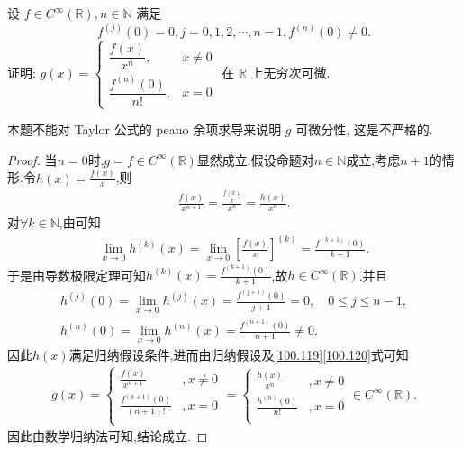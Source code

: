 \documentclass[../../main.tex]{subfiles}
\begin{document}
\begin{example}
设 $f \in C^\infty(\mathbb{R}), n \in \mathbb{N}$ 满足
\[
f^{(j)}(0) = 0, j = 0, 1, 2, \cdots, n - 1, f^{(n)}(0) \neq 0.
\]
证明: \( g(x) = \begin{cases} 
\dfrac{f(x)}{x^n}, & x \neq 0 \\
\dfrac{f^{(n)}(0)}{n!}, & x = 0 
\end{cases} \) 在 $\mathbb{R}$ 上无穷次可微.
\end{example}
\begin{note}
本题不能对 Taylor 公式的 peano 余项求导来说明 $g$ 可微分性, 这是不严格的.
\end{note}
\begin{proof}
当$n=0$时,$g=f\in C^{\infty}(\mathbb{R})$显然成立.假设命题对$n\in \mathbb{N}$成立,考虑$n+1$的情形.令$h(x)=\frac{f(x)}{x}$,则
\begin{align}
\frac{f(x)}{x^{n+1}}=\frac{\frac{f(x)}{x}}{x^n}=\frac{h(x)}{x^n}. \tag{100.119}
\end{align}
对$\forall k\in \mathbb{N}$,由可知
\begin{align*}
\lim_{x\rightarrow 0}h^{(k)}(x)=\lim_{x\rightarrow 0}\left[ \frac{f(x)}{x} \right]^{(k)}=\frac{f^{(k+1)}(0)}{k+1}.
\end{align*}
于是由\hyperref[theorem:单侧导数极限定理]{导数极限定理}可知$h^{(k)}(x)=\frac{f^{(k+1)}(0)}{k+1}$,故$h\in C^{\infty}(\mathbb{R})$.并且
\begin{gather}
h^{(j)}(0)=\lim_{x\rightarrow 0}h^{(j)}(x)=\frac{f^{(j+1)}(0)}{j+1}=0,\quad 0\leqslant j\leqslant n-1,\nonumber \\
h^{(n)}(0)=\lim_{x\rightarrow 0}h^{(n)}(x)=\frac{f^{(n+1)}(0)}{n+1}\ne 0. \label{100.120}
\end{gather}
因此$h(x)$满足归纳假设条件,进而由归纳假设及\eqref{100.119}\eqref{100.120}式可知
\begin{align*}
g(x)=\begin{cases}
\frac{f(x)}{x^{n+1}}&,x\ne 0\\
\frac{f^{(n+1)}(0)}{(n+1)!}&,x=0\\
\end{cases}=\begin{cases}
\frac{h(x)}{x^n}&,x\ne 0\\
\frac{h^{(n)}(0)}{n!}&,x=0\\
\end{cases}\in C^{\infty}(\mathbb{R}).
\end{align*}
因此由数学归纳法可知,结论成立.
\end{proof}
\end{document}
